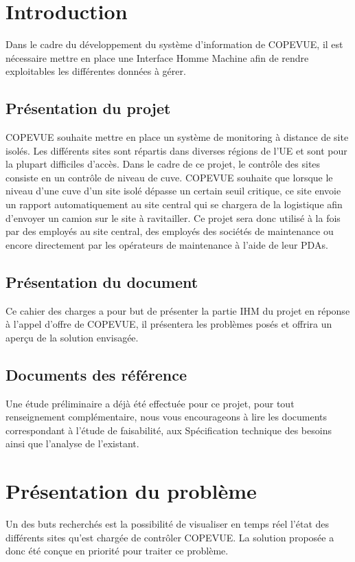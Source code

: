 \newpage
\section{Introduction}
Dans le cadre du développement du système d'information de COPEVUE, il est nécessaire mettre en place une Interface Homme Machine afin de rendre exploitables les différentes données à gérer.
\subsection{Présentation du projet}
COPEVUE souhaite mettre en place un système de monitoring à distance de site isolés. Les différents sites sont répartis dans diverses régions de l'UE et sont pour la plupart difficiles d'accès. Dans le cadre de ce projet, le contrôle des sites consiste en un contrôle de niveau de cuve. COPEVUE souhaite que lorsque le niveau d'une cuve d'un site isolé dépasse un certain seuil critique, ce site envoie un rapport automatiquement au site central qui se chargera de la logistique afin d'envoyer un camion sur le site à ravitailler. Ce projet sera donc utilisé à la fois par des employés au site central, des employés des sociétés de maintenance ou encore directement par les opérateurs de maintenance à l'aide de leur PDAs.

\subsection{Présentation du document}
Ce cahier des charges a pour but de présenter la partie IHM du projet en réponse à l'appel d'offre de COPEVUE, il présentera les problèmes posés et offrira un aperçu de la solution envisagée.
\subsection{Documents des référence}
Une étude préliminaire a déjà été effectuée pour ce projet, pour tout renseignement complémentaire, nous vous encourageons à lire les documents correspondant à l'étude de faisabilité, aux Spécification technique des besoins ainsi que l'analyse de l'existant.

\section{Présentation du problème}
Un des buts recherchés est la possibilité de visualiser en temps réel l'état des différents sites qu'est chargée de contrôler COPEVUE. La solution proposée a donc été conçue en priorité pour traiter ce problème.

